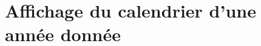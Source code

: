 \documentclass{article}
\begin{document}
			\subsubsection{}
			\subsubsection{}
				
	\section{Affichage du calendrier d'une année donnée}
		\subsection{}
			
		\subsection{}
			
		
\newpage
\end{document}
